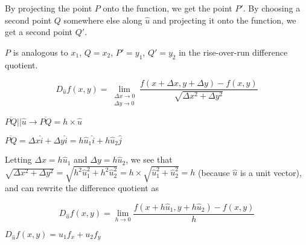 By projecting the point $P$ onto the function, we get the point $P'$. By choosing a second point $Q$ somewhere else along $\hat{u}$ and projecting it onto the function, we get a second point $Q'$.

$P$ is analogous to $x_{1}$, $Q = x_{2}$, $P' = y_{1}$, $Q' = y_{2}$ in the rise-over-run difference quotient.

$$D_{\hat{u}} f(x,y) = \lim_{\substack{\Delta x \to 0 \\ \Delta y \to 0}} \frac{f(x + \Delta x, y + \Delta y) - f(x,y)}{\sqrt{\Delta x^{2} + \Delta y^{2}}}$$

$\overline{PQ} || \hat{u} \rightarrow \overline{PQ} = h \times \hat{u}$

$\overline{PQ} = \Delta x \hat{i} + \Delta y \hat{i} = h \hat{u}_{1} \hat{i} + h \hat{u}_{2} \hat{j}$

Letting $\Delta x = h \hat{u}_{1}$ and $\Delta y = h \hat{u}_{2}$, we see that $\sqrt{\Delta x^{2} + \Delta y^{2}} = \sqrt{h^{2} \hat{u}_{1}^{2} + h^{2} \hat{u}_{2}^{2}} = h \times \sqrt{\hat{u}_{1}^{2} + \hat{u}_{2}^{2}} = h$ (because $\hat{u}$ is a unit vector), and can rewrite the difference quotient as

$$D_{\hat{u}} f(x,y) = \lim_{h \to 0} \frac{f(x + h\hat{u}_{1}, y + h\hat{u}_{2}) - f(x,y)}{h}$$

$D_{\hat{u}} f(x,y) = u_{1}f_{x} + u_{2}f_{y}$

